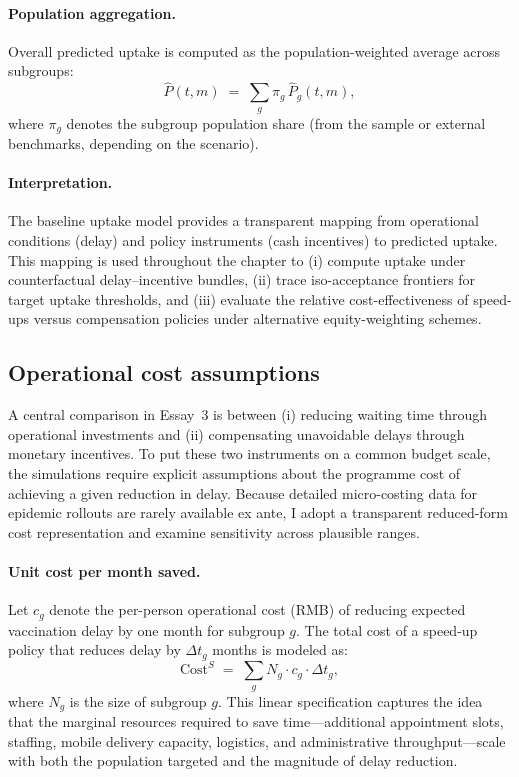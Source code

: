 \documentclass[doublespacing]{utdthesis}
\begin{document}
\paragraph{Population aggregation.}
Overall predicted uptake is computed as the population-weighted average across subgroups:
\begin{equation}
\widehat{P}(t,m) \;=\; \sum_{g} \pi_g\,\widehat{P}_g(t,m),
\label{eq:aggregate_uptake}
\end{equation}
where $\pi_g$ denotes the subgroup population share (from the sample or external benchmarks, depending on the scenario).

\paragraph{Interpretation.}
The baseline uptake model provides a transparent mapping from operational conditions (delay) and policy instruments (cash incentives) to predicted uptake. This mapping is used throughout the chapter to (i) compute uptake under counterfactual delay--incentive bundles, (ii) trace iso-acceptance frontiers for target uptake thresholds, and (iii) evaluate the relative cost-effectiveness of speed-ups versus compensation policies under alternative equity-weighting schemes.


\subsection{Operational cost assumptions}
\label{subsec:essay3_operational_costs}

A central comparison in Essay~3 is between (i) reducing waiting time through operational investments and (ii) compensating unavoidable delays through monetary incentives. To put these two instruments on a common budget scale, the simulations require explicit assumptions about the programme cost of achieving a given reduction in delay. Because detailed micro-costing data for epidemic rollouts are rarely available ex ante, I adopt a transparent reduced-form cost representation and examine sensitivity across plausible ranges.

\paragraph{Unit cost per month saved.}
Let $c_g$ denote the per-person operational cost (RMB) of reducing expected vaccination delay by one month for subgroup $g$. The total cost of a speed-up policy that reduces delay by $\Delta t_g$ months is modeled as:
\begin{equation}
\text{Cost}^{S} \;=\; \sum_{g} N_g \cdot c_g \cdot \Delta t_g,
\label{eq:speedup_cost}
\end{equation}
where $N_g$ is the size of subgroup $g$. This linear specification captures the idea that the marginal resources required to save time—additional appointment slots, staffing, mobile delivery capacity, logistics, and administrative throughput—scale with both the population targeted and the magnitude of delay reduction.
\end{document}
